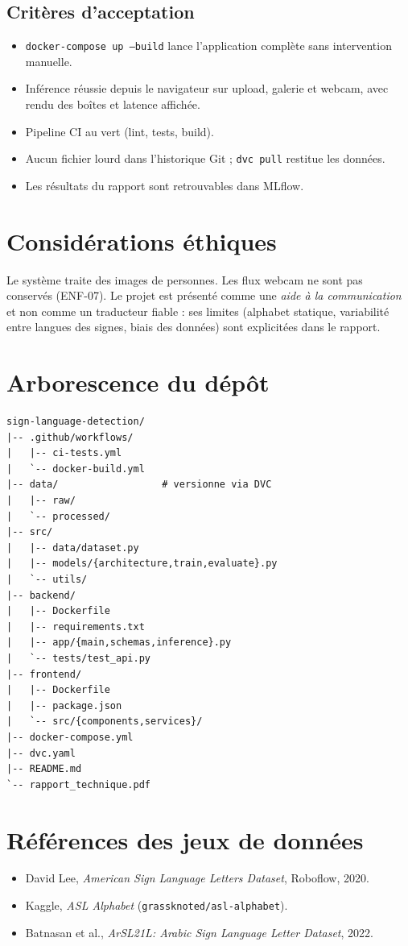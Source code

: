 \documentclass[11pt,a4paper]{article}
\begin{document}
\subsection{Critères d'acceptation}
\begin{itemize}[leftmargin=*]
  \item \texttt{docker-compose up --build} lance l'application complète sans intervention manuelle.
  \item Inférence réussie depuis le navigateur sur upload, galerie et webcam, avec rendu des boîtes et latence affichée.
  \item Pipeline CI au vert (lint, tests, build).
  \item Aucun fichier lourd dans l'historique Git ; \texttt{dvc pull} restitue les données.
  \item Les résultats du rapport sont retrouvables dans MLflow.
\end{itemize}

\section{Considérations éthiques}
Le système traite des images de personnes. Les flux webcam ne sont pas conservés (ENF-07). Le projet est présenté comme une \emph{aide à la communication} et non comme un traducteur fiable : ses limites (alphabet statique, variabilité entre langues des signes, biais des données) sont explicitées dans le rapport.

\appendix
\section{Arborescence du dépôt}
\begin{lstlisting}
sign-language-detection/
|-- .github/workflows/
|   |-- ci-tests.yml
|   `-- docker-build.yml
|-- data/                  # versionne via DVC
|   |-- raw/
|   `-- processed/
|-- src/
|   |-- data/dataset.py
|   |-- models/{architecture,train,evaluate}.py
|   `-- utils/
|-- backend/
|   |-- Dockerfile
|   |-- requirements.txt
|   |-- app/{main,schemas,inference}.py
|   `-- tests/test_api.py
|-- frontend/
|   |-- Dockerfile
|   |-- package.json
|   `-- src/{components,services}/
|-- docker-compose.yml
|-- dvc.yaml
|-- README.md
`-- rapport_technique.pdf
\end{lstlisting}

\section{Références des jeux de données}
\begin{itemize}[leftmargin=*]
  \item David Lee, \textit{American Sign Language Letters Dataset}, Roboflow, 2020.
  \item Kaggle, \textit{ASL Alphabet} (\texttt{grassknoted/asl-alphabet}).
  \item Batnasan et al., \textit{ArSL21L: Arabic Sign Language Letter Dataset}, 2022.
\end{itemize}
\end{document}

